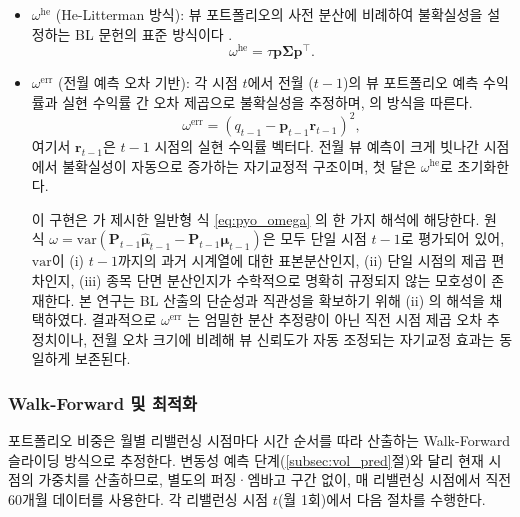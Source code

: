 \documentclass{article}
\begin{document}
\begin{itemize}
  \item $\omega^{\mathrm{he}}$ (He-Litterman 방식): 뷰 포트폴리오의 사전 분산에 비례하여 불확실성을 설정하는 BL 문헌의 표준 방식이다 \citep{helitterman1999}.
    \begin{equation}
      \omega^{\mathrm{he}} = \tau\mathbf{p}\boldsymbol{\Sigma}\mathbf{p}^\top.
    \end{equation}

  \item $\omega^{\mathrm{err}}$ (전월 예측 오차 기반): 각 시점 $t$에서 전월 ($t-1$)의 뷰 포트폴리오 예측 수익률과 실현 수익률 간 오차 제곱으로 불확실성을 추정하며, \citet{pyo2018}의 방식을 따른다.
    \begin{equation}
      \omega^{\mathrm{err}} = \left(q_{t-1} - \mathbf{p}_{t-1}\mathbf{r}_{t-1}\right)^2,
    \end{equation}
    여기서 $\mathbf{r}_{t-1}$은 $t-1$ 시점의 실현 수익률 벡터다. 전월 뷰 예측이 크게 빗나간 시점에서 불확실성이 자동으로 증가하는 자기교정적 구조이며, 첫 달은 $\omega^{\mathrm{he}}$로 초기화한다.

    이 구현은 \citet{pyo2018} 가 제시한 일반형 식 \eqref{eq:pyo_omega} 의 한 가지 해석에 해당한다. 원 식 $\omega = \mathrm{var}(\mathbf{P}_{t-1}\hat{\boldsymbol{\mu}}_{t-1} - \mathbf{P}_{t-1}\boldsymbol{\mu}_{t-1})$은 모두 단일 시점 $t-1$로 평가되어 있어, $\mathrm{var}$이 (i) $t-1$까지의 과거 시계열에 대한 표본분산인지, (ii) 단일 시점의 제곱 편차인지, (iii) 종목 단면 분산인지가 수학적으로 명확히 규정되지 않는 모호성이 존재한다. 본 연구는 BL 산출의 단순성과 직관성을 확보하기 위해 (ii) 의 해석을 채택하였다. 결과적으로 $\omega^{\mathrm{err}}$ 는 엄밀한 분산 추정량이 아닌 직전 시점 제곱 오차 추정치이나, 전월 오차 크기에 비례해 뷰 신뢰도가 자동 조정되는 자기교정 효과는 동일하게 보존된다.
\end{itemize}

\subsubsection{Walk-Forward 및 최적화}
\label{subsubsec:bl_walkforward}

포트폴리오 비중은 월별 리밸런싱 시점마다 시간 순서를 따라 산출하는 Walk-Forward 슬라이딩 방식으로 추정한다. 변동성 예측 단계(\ref{subsec:vol_pred}절)와 달리 현재 시점의 가중치를 산출하므로, 별도의 퍼징·엠바고 구간 없이, 매 리밸런싱 시점에서 직전 60개월 데이터를 사용한다. 각 리밸런싱 시점 $t$(월 1회)에서 다음 절차를 수행한다.
\end{document}
